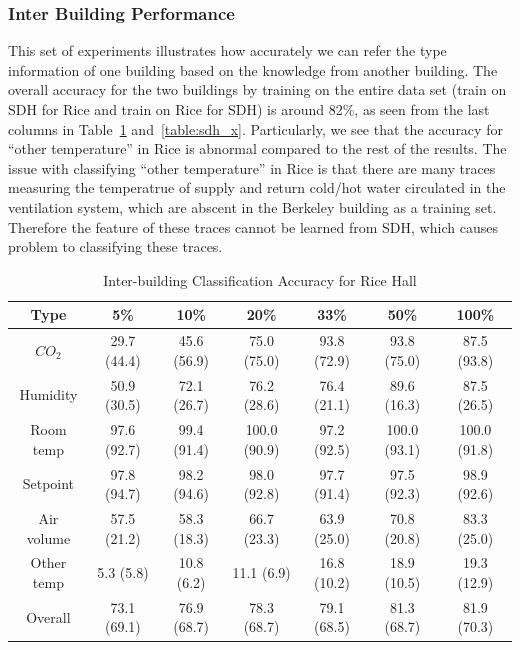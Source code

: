 \subsubsection{Inter Building Performance}
This set of experiments illustrates how accurately we can refer the type information of one building based on the knowledge from another building. The overall accuracy for the two buildings by training on the entire data set (train on SDH for Rice and train on Rice for SDH) is around 82\%, as seen from the last columns in Table~\ref{table:rice_x} and~\ref{table:sdh_x}. Particularly, we see that the accuracy for ``other temperature'' in Rice is abnormal compared to the rest of the
results. The issue with classifying ``other temperature'' in Rice is that there are many traces measuring the temperatrue of supply and return cold/hot water circulated in the ventilation system, which are abscent in the Berkeley building as a training set. Therefore the feature of these traces cannot be learned from SDH, which causes problem to classifying these traces.

\begin{table}[ht!]
\centering %
\begin{tabular}{c | c | c | c | c | c | c}%
\hline %
Type & 5\% & 10\% & 20\% & 33\% & 50\% & 100\% \\ %
\hline\hline %
$CO_{2}$ & 29.7 (44.4) & 45.6 (56.9) & 75.0 (75.0) & 93.8 (72.9) & 93.8 (75.0) & 87.5 (93.8)\\ \hline
Humidity & 50.9 (30.5) & 72.1 (26.7) & 76.2 (28.6) & 76.4 (21.1) & 89.6 (16.3) & 87.5 (26.5)\\ \hline
Room temp & 97.6 (92.7) & 99.4 (91.4) & 100.0 (90.9) & 97.2 (92.5) & 100.0 (93.1) & 100.0 (91.8)\\ \hline
Setpoint & 97.8 (94.7) & 98.2 (94.6) & 98.0 (92.8) & 97.7 (91.4) & 97.5 (92.3) & 98.9 (92.6)\\ \hline
Air volume & 57.5 (21.2) & 58.3 (18.3) & 66.7 (23.3) & 63.9 (25.0) & 70.8 (20.8) & 83.3 (25.0)\\ \hline
Other temp & 5.3 (5.8) & 10.8 (6.2) & 11.1 (6.9) & 16.8 (10.2) & 18.9 (10.5) & 19.3 (12.9)\\ \hline
Overall & 73.1 (69.1) & 76.9 (68.7) & 78.3 (68.7) & 79.1 (68.5) & 81.3 (68.7) & 81.9 (70.3)\\ \hline
\end{tabular}
\caption{Inter-building Classification Accuracy for Rice Hall}
\label{table:rice_x} %
\end{table}

